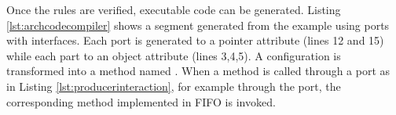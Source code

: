 Once the rules are verified, executable code can be generated. 
Listing \ref{lst:archcodecompiler} shows a  segment generated from the  example using ports with interfaces.
Each port is generated to a pointer attribute (lines 12 and 15) while each part to an object attribute (lines 3,4,5).
A configuration is transformed into a method named .
When a method is called through a port as in Listing \ref{lst:producerinteraction}, for example  through the  port, the corresponding method implemented in FIFO is invoked. 

\begin{minipage}{\columnwidth}
	
\end{minipage} 

